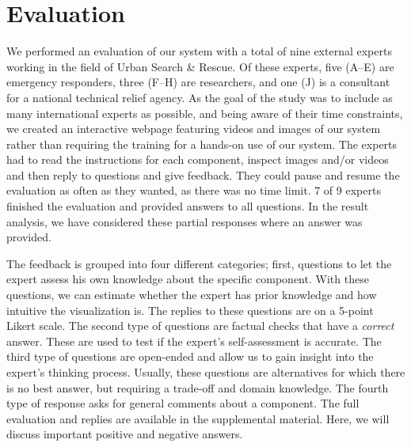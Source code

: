 \documentclass[conference,10pt,letter]{IEEEtran}
\begin{document}
\section{Evaluation} \label{sec:evaluation}
We performed an evaluation of our system with a total of nine external experts working in the field of Urban Search \& Rescue. Of these experts, five (A--E) are emergency responders, three (F--H) are researchers, and one (J) is a consultant for a national technical relief agency. As the goal of the study was to include as many international experts as possible, and being aware of their time constraints, we created an interactive webpage featuring videos and images of our system rather than requiring the training for a hands-on use of our system. The experts had to read the instructions for each component, inspect images and/or videos and then reply to questions and give feedback. They could pause and resume the evaluation as often as they wanted, as there was no time limit. 7 of 9 experts finished the evaluation and provided answers to all questions. In the result analysis, we have considered these partial responses where an answer was provided.

The feedback is grouped into four different categories; first, questions to let the expert assess his own knowledge about the specific component. With these questions, we can estimate whether the expert has prior knowledge and how intuitive the visualization is. The replies to these questions are on a 5-point Likert scale. The second type of questions are factual checks that have a \emph{correct} answer. These are used to test if the expert's self-assessment is accurate. The third type of questions are open-ended and allow us to gain insight into the expert's thinking process. Usually, these questions are alternatives for which there is no best answer, but requiring a trade-off and domain knowledge. The fourth type of response asks for general comments about a component. The full evaluation and replies are available in the supplemental material. Here, we will discuss important positive and negative answers. 
\end{document}
